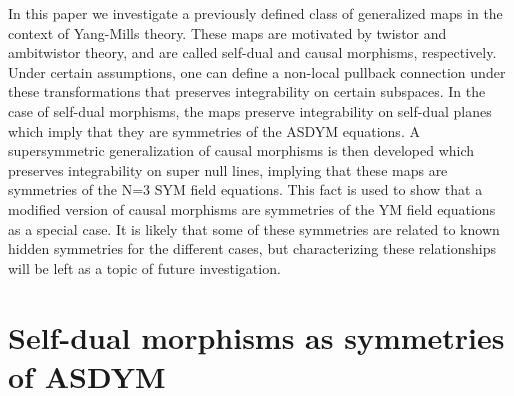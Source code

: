 \documentclass[12pt]{article}
\begin{document}
In this paper we investigate a previously defined class of generalized maps \cite{https://doi.org/10.48550/arxiv.2203.07952} in the context of Yang-Mills theory. These maps are motivated by  twistor and ambitwistor theory, and are called self-dual and causal morphisms, respectively.  Under certain assumptions, one can define a non-local pullback connection under these transformations that preserves integrability on certain subspaces.  In the case of self-dual morphisms, the maps preserve integrability on self-dual planes which imply that they are symmetries of the ASDYM equations.  A supersymmetric generalization of causal morphisms is then developed which preserves integrability on super null lines, implying that these maps are symmetries of the N=3 SYM field equations.  This fact is used to show that a modified version of causal morphisms are symmetries of the YM field equations as a special case.    It is likely that some of these symmetries are related to known hidden symmetries for the different cases, but characterizing these relationships will be left as a topic of future investigation.  


 

\section{Self-dual morphisms as symmetries of ASDYM}
\end{document}
